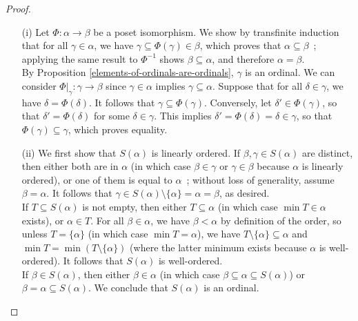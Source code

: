 \begin{proof}
    \begin{itemize}
        \item[(i)] Let $\Phi : \alpha \to \beta$ be a poset isomorphism. We show by transfinite induction that for all $\gamma \in \alpha$, we have $\gamma \subseteq \Phi(\gamma) \in \beta$, which proves that $\alpha \subseteq \beta$~; applying the same result to $\Phi^{-1}$ shows $\beta \subseteq \alpha$, and therefore $\alpha = \beta$.
        \\
        
        By Proposition \autoref{elements-of-ordinals-are-ordinals}, $\gamma$ is an ordinal. We can consider $\Phi|_{\gamma} : \gamma \to \beta$ since $\gamma \in \alpha$ implies $\gamma \subseteq \alpha$. Suppose that for all $\delta \in \gamma$, we have $\delta = \Phi(\delta)$. It follows that $\gamma \subseteq \Phi(\gamma)$. Conversely, let $\delta' \in \Phi(\gamma)$, so that $\delta' = \Phi(\delta)$ for some $\delta \in \gamma$. This implies $\delta' = \Phi(\delta) = \delta \in \gamma$, so that $\Phi(\gamma) \subseteq \gamma$, which proves equality.
        \\

        \item[(ii)] We first show that $S(\alpha)$ is linearly ordered. If $\beta,\gamma \in S(\alpha)$ are distinct, then either both are in $\alpha$ (in which case $\beta \in \gamma$ or $\gamma \in \beta$ because $\alpha$ is linearly ordered), or one of them is equal to $\alpha$~; without loss of generality, assume $\beta = \alpha$. It follows that $\gamma \in S(\alpha) \setminus \{\alpha\} = \alpha = \beta$, as desired.
        \\

        If $T \subseteq S(\alpha)$ is not empty, then either $T \subseteq \alpha$ (in which case $\min T \in \alpha$ exists), or $\alpha \in T$. For all $\beta \in \alpha$, we have $\beta < \alpha$ by definition of the order, so unless $T = \{\alpha\}$ (in which case $\min T = \alpha$), we have $T \setminus \{\alpha\} \subseteq \alpha$ and $\min T = \min (T \setminus \{\alpha\})$ (where the latter minimum exists because $\alpha$ is well-ordered). It follows that $S(\alpha)$ is well-ordered. 
        \\

        If $\beta \in S(\alpha)$, then either $\beta \in \alpha$ (in which case $\beta \subseteq \alpha \subseteq S(\alpha)$) or $\beta = \alpha \subseteq S(\alpha)$. We conclude that $S(\alpha)$ is an ordinal.
        \\


\end{itemize}
\end{proof}
